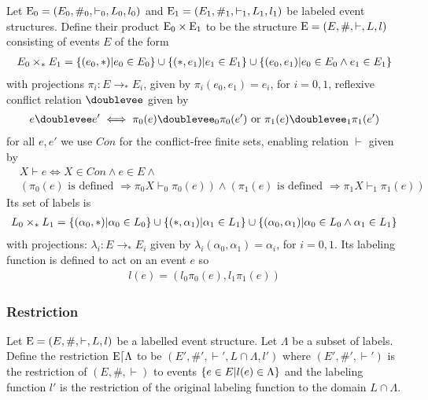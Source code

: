 \begin{definition}
    Let $\mathrm{E_0} = (E_0,\#_0,\vdash_0,L_0,l_0)$ and
    $\mathrm{E_1} = (E_1,\#_1,\vdash_1,L_1,l_1)$
    be labeled event structures.
    Define their product $\mathrm{E_0} \times \mathrm{E_1}$ to be the structure $\mathrm{E} = (E,\#,\vdash,L,l)$
    consisting of events $E$ of the form
    \begin{align*}
        E_0 \times_* E_1 =
        \{(e_0,*)|e_0 \in E_0\}
        \cup \{(*,e_1)|e_1 \in E_1\}
        \cup \{(e_0,e_1)| e_0 \in E_0 \wedge e_1 \in E_1\}
    \end{align*}
    with projections $\pi_i : E \rightarrow_* E_i$,
    given by $\pi_i(e_0,e_1) = e_i$, for $i=0,1$, reflexive conflict relation $\doublevee$ given by
    \begin{align*}
        e \doublevee e' \iff \pi_0(e) \doublevee_0 \pi_0(e') \text{ or }
        \pi_1(e) \doublevee_1 \pi_1(e')
    \end{align*}
    for all $e,e'$ we use $Con$ for the conflict-free finite sets,
    enabling relation $\vdash$ given by
    \begin{align*}
         & X \vdash e \iff X \in Con \wedge e \in E \wedge                  \\
         & (\pi_0(e)\text{ is defined } \Rightarrow \pi_0X\vdash_0\pi_0(e))
        \wedge (\pi_1(e)\text{ is defined } \Rightarrow \pi_1X\vdash_1\pi_1(e))
    \end{align*}
    Its set of labels is
    \begin{align*}
        L_0 \times_* L_1 = \{ (\alpha_0,*)|\alpha_0 \in L_0\}
        \cup \{(*,\alpha_1)|\alpha_1 \in L_1\}
        \cup \{(\alpha_0,\alpha_1)|\alpha_0 \in L_0 \wedge \alpha_1 \in L_1\}
    \end{align*}
    with projections: $\lambda_i: E \rightarrow_* E_i$ given by
    $\lambda_i(\alpha_0,\alpha_1) = \alpha_i$, for $i=0,1$.
    Its labeling function is defined to act on an event $e$ so
    \begin{align*}
        l(e) = (l_0\pi_0(e),l_1\pi_1(e))
    \end{align*}
\end{definition}

\subsubsection{Restriction}

\begin{definition}

    Let $\mathrm{E} = (E,\#,\vdash,L,l)$ be a labelled event structure.
    Let $\Lambda$ be a subset of labels.
    Define the restriction $\mathrm{E}\lceil \Lambda$ to be $(E',\#',\vdash',L\cap \Lambda,l')$
    where $(E',\#',\vdash')$ is the restriction of $(E,\#,\vdash)$
    to events $\{e \in E|l(e) \in \Lambda\}$ and the labeling function $l'$
    is the restriction of the original labeling function to the domain $L \cap \Lambda$.
\end{definition}

